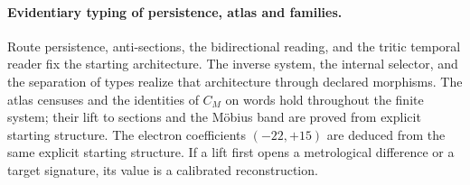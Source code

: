 \paragraph{Evidentiary typing of persistence, atlas and families.}
Route persistence, anti-sections, the bidirectional reading, and the tritic temporal reader fix the starting architecture. The inverse system, the internal selector, and the separation of types realize that architecture through declared morphisms. The atlas censuses and the identities of \(C_M\) on words hold throughout the finite system; their lift to sections and the Möbius band are proved from explicit starting structure. The electron coefficients \((-22,+15)\) are deduced from the same explicit starting structure. If a lift first opens a metrological difference or a target signature, its value is a calibrated reconstruction.
